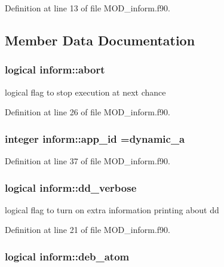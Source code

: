 Definition at line 13 of file M\-O\-D\-\_\-inform.\-f90.



\subsection{Member Data Documentation}
\hypertarget{classinform_a7b064480f04afeeb78427a994974fe57}{
\subsubsection[{abort}]{\setlength{\rightskip}{0pt plus 5cm}logical inform\-::abort}}\label{classinform_a7b064480f04afeeb78427a994974fe57}


logical flag to stop execution at next chance 



Definition at line 26 of file M\-O\-D\-\_\-inform.\-f90.

\hypertarget{classinform_a3a4881b89f8850fdd49040ea3fc007b2}{
\subsubsection[{app\-\_\-id}]{\setlength{\rightskip}{0pt plus 5cm}integer inform\-::app\-\_\-id =dynamic\-\_\-a}}\label{classinform_a3a4881b89f8850fdd49040ea3fc007b2}


Definition at line 37 of file M\-O\-D\-\_\-inform.\-f90.

\hypertarget{classinform_ab86017b6d4b5987b1b765e0a4d9a8621}{
\subsubsection[{dd\-\_\-verbose}]{\setlength{\rightskip}{0pt plus 5cm}logical inform\-::dd\-\_\-verbose}}\label{classinform_ab86017b6d4b5987b1b765e0a4d9a8621}


logical flag to turn on extra information printing about dd 



Definition at line 21 of file M\-O\-D\-\_\-inform.\-f90.

\hypertarget{classinform_ad1e4bda31e728b83a1a85490235ed3ee}{
\subsubsection[{deb\-\_\-atom}]{\setlength{\rightskip}{0pt plus 5cm}logical inform\-::deb\-\_\-atom}}\label{classinform_ad1e4bda31e728b83a1a85490235ed3ee}


